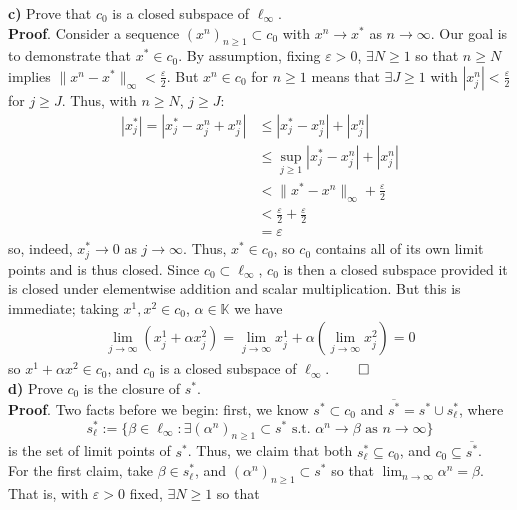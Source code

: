 \documentclass[10pt]{article}
\newcommand{\mbb}[1]{\mathbb{#1}}
\newcommand{\1}[1]{\mathbbm{1}_{#1}}
\begin{document}
    {\bf c)} Prove that $c_0$ is a closed subspace of $\ell_\infty$.\\[5pt]
    {\bf Proof}. Consider a sequence $(x^n)_{n\geq1}\subset c_0$ with $x^n\rightarrow x^\ast$ as $n\rightarrow\infty$. Our goal is to demonstrate that
    $x^\ast\in c_0$. By assumption, fixing $\varepsilon>0$, $\exists N\geq 1$ so that $n\geq N$ implies $\|x^n-x^\ast\|_\infty<\tfrac{\varepsilon}{2}$. But $x^n\in c_0$ for $n\geq 1$
    means that $\exists J\geq 1$ with $|x^n_j|<\tfrac{\varepsilon}{2}$ for $j\geq J$. Thus, with $n\geq N$, $j\geq J$:
    \begin{align*}
        |x_j^\ast|=|x^\ast_j-x^n_j+x^n_j|&\leq |x^\ast_j-x^n_j|+|x^n_j|\\
        &\leq\sup_{j\geq 1}|x^\ast_j-x^n_j|+|x^n_j|\\
        &<\|x^\ast-x^n\|_{\infty}+\frac{\varepsilon}{2}\\
        &<\frac{\varepsilon}{2}+\frac{\varepsilon}{2}\\
        &=\varepsilon
    \end{align*}
    so, indeed, $x^\ast_j\rightarrow 0$ as $j\rightarrow\infty$. Thus, $x^\ast\in c_0$, so $c_0$ contains all of its own limit points and is thus closed. Since $c_0\subset\ell_\infty$, $c_0$ is then a closed
    subspace provided it is closed under elementwise addition and scalar multiplication. But this is immediate; taking $x^1,x^2\in c_0$, $\alpha\in\mbb{K}$ we have
    \begin{align*}
        \lim_{j\rightarrow\infty}(x^1_j+\alpha x^2_j)=\lim_{j\rightarrow\infty}x^1_j+\alpha(\lim_{j\rightarrow\infty}x^2_j)=0
    \end{align*}
    so $x^1+\alpha x^2\in c_0$, and $c_0$ is a closed subspace of $\ell_\infty$.\hfill{$\qed$}\\[5pt]
    {\bf d)} Prove $c_0$ is the closure of $s^\ast$.\\[5pt]
    {\bf Proof}. Two facts before we begin: first, we know $s^\ast\subset c_0$ and $\overline{s^\ast}=s^\ast\cup s^\ast_\ell$, where
    \[s^\ast_\ell:=\{\beta\in\ell_\infty:\exists(\alpha^n)_{n\geq 1}\subset s^\ast\text{ s.t. }\alpha^n\rightarrow\beta\text{ as } n\rightarrow\infty\}\]
    is the set of limit points of $s^\ast$. Thus, we claim that both $s^\ast_\ell\subseteq c_0$, and $c_0\subseteq\overline{s^\ast}$.\\[5pt]
    For the first claim, take $\beta\in s^\ast_\ell$, and $(\alpha^n)_{n\geq 1}\subset s^\ast$ so that $\lim_{n\rightarrow\infty}\alpha^n=\beta$. That is, with $\varepsilon>0$ fixed, $\exists N\geq 1$ so that
\end{document}
